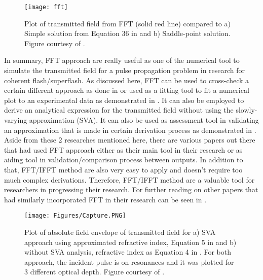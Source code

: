 \begin{figure}[h!]
    \centering
    \texttt{[image: fft]}
    \caption{Plot of transmitted field from FFT (solid red line) compared to a) Simple solution from Equation 36 in \cite{Macke2013} and b) Saddle-point solution. Figure courtesy of \cite{Macke2013}.}
    \label{fig: fft}
\end{figure}

\newpage

In summary, FFT approach are really useful as one of the numerical tool to simulate the transmitted field for a pulse propagation problem in research for coherent flash/superflash. As discussed here, FFT can be used to cross-check a certain different approach as done in \cite{jeong2010slow} or used as a fitting tool to fit a numerical plot to an experimental data as demonstrated in \cite{Chen2010}. It can also be employed to derive an analytical expression for the transmitted field without using the slowly-varying approximation (SVA). It can also be used as assessment tool in validating an approximation that is made in certain derivation process as demonstrated in \cite{Jeong2008}. Aside from these 2 researches mentioned here, there are various papers out there that had used FFT approach either as their main tool in their research or as aiding tool in validation/comparison process between outputs. In addition to that, FFT/IFFT method are also very easy to apply and doesn't require too much complex derivations. Therefore, FFT/IFFT method are a valuable tool for researchers in progressing their research. For further reading on other papers that had similarly incorporated FFT in their research can be seen in \cite{Jeong2019, jeong2010slow, Chen2010, Macke2015, Oughstun2010, Wei2009, MacKe2009}.

\begin{figure}[h!]
    \centering
    \texttt{[image: Figures/Capture.PNG]}
    \caption{Plot of absolute field envelope of transmitted field for a) SVA approach using approximated refractive index, Equation 5 in \cite{Jeong2008} and b) without SVA analysis, refractive index as Equation 4 in \cite{Jeong2008}. For both approach, the incident pulse is on-resonances and it was plotted for 3 different optical depth. Figure courtesy of \cite{Jeong2008}.}
    \label{fig: svafft}
\end{figure}
